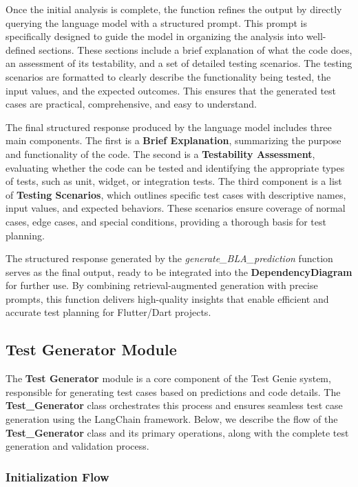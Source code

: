 Once the initial analysis is complete, the function refines the output by directly querying the language model with a structured prompt. This prompt is specifically designed to guide the model in organizing the analysis into well-defined sections. These sections include a brief explanation of what the code does, an assessment of its testability, and a set of detailed testing scenarios. The testing scenarios are formatted to clearly describe the functionality being tested, the input values, and the expected outcomes. This ensures that the generated test cases are practical, comprehensive, and easy to understand.

The final structured response produced by the language model includes three main components. The first is a \textbf{Brief Explanation}, summarizing the purpose and functionality of the code. The second is a \textbf{Testability Assessment}, evaluating whether the code can be tested and identifying the appropriate types of tests, such as unit, widget, or integration tests. The third component is a list of \textbf{Testing Scenarios}, which outlines specific test cases with descriptive names, input values, and expected behaviors. These scenarios ensure coverage of normal cases, edge cases, and special conditions, providing a thorough basis for test planning.

The structured response generated by the \textit{generate\_BLA\_prediction} function serves as the final output, ready to be integrated into the \textbf{DependencyDiagram} for further use. By combining retrieval-augmented generation with precise prompts, this function delivers high-quality insights that enable efficient and accurate test planning for Flutter/Dart projects.

\subsection{Test Generator Module}

The \textbf{Test Generator} module is a core component of the Test Genie system, responsible for generating test cases based on predictions and code details. The \textbf{Test\_Generator} class orchestrates this process and ensures seamless test case generation using the LangChain framework. Below, we describe the flow of the \textbf{Test\_Generator} class and its primary operations, along with the complete test generation and validation process.

\subsubsection{Initialization Flow}


